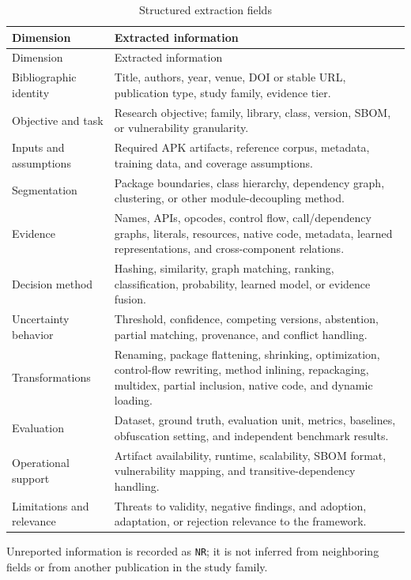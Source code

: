 \begin{longtable}{p{}p{}}
  \caption{Structured extraction fields}
  \label{tab:review-extraction-schema}\\
  \toprule
  Dimension & Extracted information \\
  \midrule
  \endfirsthead
  \toprule
  Dimension & Extracted information \\
  \midrule
  \endhead
  Bibliographic identity & Title, authors, year, venue, DOI or stable URL,
    publication type, study family, evidence tier. \\
  Objective and task & Research objective; family, library, class, version,
    SBOM, or vulnerability granularity. \\
  Inputs and assumptions & Required APK artifacts, reference corpus,
    metadata, training data, and coverage assumptions. \\
  Segmentation & Package boundaries, class hierarchy, dependency graph,
    clustering, or other module-decoupling method. \\
  Evidence & Names, APIs, opcodes, control flow, call/dependency graphs,
    literals, resources, native code, metadata, learned representations, and
    cross-component relations. \\
  Decision method & Hashing, similarity, graph matching, ranking,
    classification, probability, learned model, or evidence fusion. \\
  Uncertainty behavior & Threshold, confidence, competing versions,
    abstention, partial matching, provenance, and conflict handling. \\
  Transformations & Renaming, package flattening, shrinking, optimization,
    control-flow rewriting, method inlining, repackaging, multidex, partial
    inclusion, native code, and dynamic loading. \\
  Evaluation & Dataset, ground truth, evaluation unit, metrics, baselines,
    obfuscation setting, and independent benchmark results. \\
  Operational support & Artifact availability, runtime, scalability, SBOM
    format, vulnerability mapping, and transitive-dependency handling. \\
  Limitations and relevance & Threats to validity, negative findings, and
    adoption, adaptation, or rejection relevance to the framework. \\
  \bottomrule
\end{longtable}

Unreported information is recorded as \texttt{NR}; it is not inferred from
neighboring fields or from another publication in the study family.

